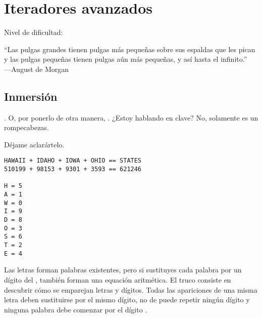 
\chapter{Iteradores avanzados}\label{ch:clases}

\noindent
Nivel de dificultad:\difllll

\begin{citaCap}
``Las pulgas grandes tienen pulgas más pequeñas sobre sus espaldas que les pican \\
y las pulgas pequeñas tienen pulgas aún más pequeñas, y así hasta el infinito.''\\
---August de Morgan
\end{citaCap}

\section{Inmersión}

. O, por ponerlo de otra manera, . ¿Estoy hablando en clave? No, solamente es un rompecabezas.

Déjame aclarártelo.

\noindent\begin{minipage}{\textwidth}
\begin{lstlisting}[mathescape=True]
HAWAII + IDAHO + IOWA + OHIO == STATES
510199 + 98153 + 9301 + 3593 == 621246

H = 5
A = 1
W = 0
I = 9
D = 8
O = 3
S = 6
T = 2
E = 4
\end{lstlisting}
\end{minipage}

Las letras forman palabras existentes, pero si sustituyes cada palabra por un dígito del , también forman una equación aritmética. El truco consiste en descubrir cómo se emparejan letras y dígitos. Todas las apariciones de una misma letra deben sustituirse por el mismo dígito, no de puede repetir ningún dígito y ninguna palabra debe comenzar por el dígito .


